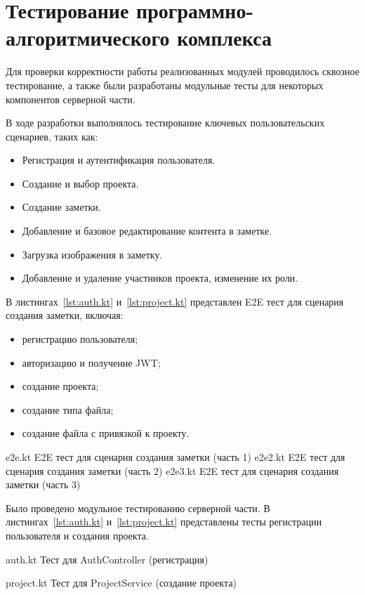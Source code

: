 \section{Тестирование программно-алгоритмического комплекса}

Для проверки корректности работы реализованных модулей проводилось сквозное тестирование, а также были разработаны модульные тесты для некоторых компонентов серверной части.

В ходе разработки выполнялось тестирование ключевых пользовательских сценариев, таких как:
\begin{itemize}[wide=12.5mm, leftmargin=12.5mm]
    \item Регистрация и аутентификация пользователя.
    \item Создание и выбор проекта.
    \item Создание заметки.
    \item Добавление и базовое редактирование контента в заметке.
    \item Загрузка изображения в заметку.
    \item Добавление и удаление участников проекта, изменение их роли.
\end{itemize}
В листингах~\ref{lst:auth.kt} и~\ref{lst:project.kt} представлен E2E тест для сценария создания заметки, включая:  
\begin{itemize}[wide=12.5mm, leftmargin=12.5mm]
    \item регистрацию пользователя;
    \item авторизацию и получение JWT;
    \item создание проекта;
    \item создание типа файла;
    \item создание файла с привязкой к проекту.
\end{itemize}
\clearpage
{}
	{e2e.kt}
	{E2E тест для сценария создания заметки (часть 1)}
\clearpage
{}
    {e2e2.kt}
    {E2E тест для сценария создания заметки (часть 2)}
\clearpage
{}
    {e2e3.kt}
    {E2E тест для сценария создания заметки (часть 3)}

Было проведено модульное тестированию серверной части. 
В листингах~\ref{lst:auth.kt} и~\ref{lst:project.kt} представлены тесты регистрации пользователя и создания проекта. 

\clearpage
{}
	{auth.kt}
	{Тест для AuthController (регистрация)}

\clearpage
{}
	{project.kt}
	{Тест для ProjectService (создание проекта)}

